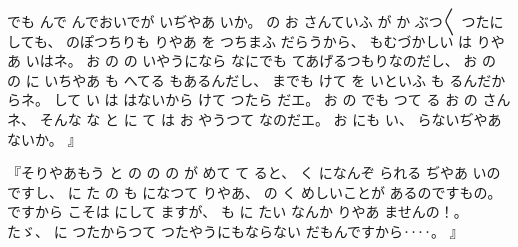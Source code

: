 %
でも
んで
んでおいでが
いぢやあ
いか。
%
の
お
さんていふ
が
か
ぶつ〳〵
つたにしても、
%
のぽつちりも
りやあ
を
つちまふ
だらうから、
%
もむづかしい
は
りやあ
いはネ。
%
お
の
の
いやうになら
なにでも
てあげるつもりなのだし、
%
お
の
の
に
いちやあ
も
へてる%
もあるんだし、
%
までも
けて
を
いといふ
も
るんだからネ。
%
して
い
は
はないから
けて
つたら
だエ。
%
お
の
でも
つて
る
お
の
さんネ、
%
そんな
な
と
に
て
は
お
やうつて
なのだエ。
%
お
にも
い、
%
らないぢやあないか。
』

%
『そりやあもう
と
の
の
の
が
めて
て
ると、
%
く
になんぞ
られる
ぢやあ
いのですし、
%
に
た
の
も
になつて
りやあ、
%
の
く
めしいことが
あるのですもの。
%
ですから
こそは
にして
ますが、
%
も
に
たい
なんか
りやあ
ませんの！。
%
たゞ、
%
に
つたからつて
つたやうにもならない
だもんですから‥‥。
』

